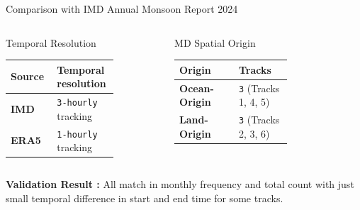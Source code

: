 \documentclass[8pt, aspectratio=169]{beamer}
\begin{document}
\begin{frame}[label=comparison]{Comparison with IMD Annual Monsoon Report 2024}
    \vspace{0.6cm}
    \begin{columns}[T, onlytextwidth]
        \footnotesize
        \centering
        \begin{block}{Temporal Resolution}
            \begin{tabular}{p{0.4\linewidth} p{0.3\linewidth}}
                \toprule
                Source & Temporal resolution\\
                \midrule
                \textbf{IMD} & \texttt{3-hourly} tracking \\
                \textbf{ERA5} & \texttt{1-hourly} tracking \\
                \bottomrule
            \end{tabular}
        \end{block}

        \footnotesize
        \centering
        \begin{block}{MD Spatial Origin}
            \begin{tabular}{p{0.4\linewidth} p{0.3\linewidth}}
                \toprule
                Origin       & Tracks \\
                \midrule
                \textbf{Ocean-Origin} & \texttt{3} (Tracks 1, 4, 5) \\
                \textbf{Land-Origin} & \texttt{3} (Tracks 2, 3, 6) \\
                \bottomrule
            \end{tabular}
        \end{block}
    \end{columns}

    \vspace{0.6cm}
    \begin{center}
        \footnotesize
        \textbf{Validation Result :} All match in monthly frequency and total count with just small temporal difference in start and end time for some tracks.
    \end{center}

    \vfill
\end{frame}
\end{document}

